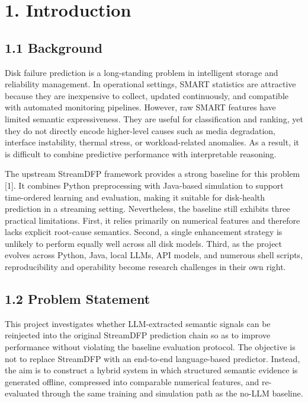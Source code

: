 \documentclass[
  11pt,
  a4paper]{article}
\begin{document}
\hypertarget{introduction}{%
\section{1. Introduction}\label{introduction}}

\hypertarget{background}{%
\subsection{1.1 Background}\label{background}}

Disk failure prediction is a long-standing problem in intelligent
storage and reliability management. In operational settings, SMART
statistics are attractive because they are inexpensive to collect,
updated continuously, and compatible with automated monitoring
pipelines. However, raw SMART features have limited semantic
expressiveness. They are useful for classification and ranking, yet they
do not directly encode higher-level causes such as media degradation,
interface instability, thermal stress, or workload-related anomalies. As
a result, it is difficult to combine predictive performance with
interpretable reasoning.

The upstream StreamDFP framework provides a strong baseline for this
problem {[}1{]}. It combines Python preprocessing with Java-based
simulation to support time-ordered learning and evaluation, making it
suitable for disk-health prediction in a streaming setting.
Nevertheless, the baseline still exhibits three practical limitations.
First, it relies primarily on numerical features and therefore lacks
explicit root-cause semantics. Second, a single enhancement strategy is
unlikely to perform equally well across all disk models. Third, as the
project evolves across Python, Java, local LLMs, API models, and
numerous shell scripts, reproducibility and operability become research
challenges in their own right.

\hypertarget{problem-statement}{%
\subsection{1.2 Problem Statement}\label{problem-statement}}

This project investigates whether LLM-extracted semantic signals can be
reinjected into the original StreamDFP prediction chain so as to improve
performance without violating the baseline evaluation protocol. The
objective is not to replace StreamDFP with an end-to-end language-based
predictor. Instead, the aim is to construct a hybrid system in which
structured semantic evidence is generated offline, compressed into
comparable numerical features, and re-evaluated through the same
training and simulation path as the no-LLM baseline.
\end{document}

